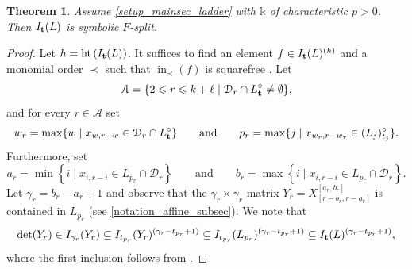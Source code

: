 \documentclass[12pt]{amsart}
\renewcommand{\leq}{\leqslant}
\newtheorem{theorem}{Theorem}[section]
\theoremstyle{definition}
\renewcommand{\(}{\left(}
\renewcommand{\)}{\right)}
\newcommand{\ZZ}{\mathbb{Z}}
\newcommand{\IN}{\operatorname{in}}
\newcommand{\Ht}{\operatorname{ht}}
\renewcommand{\!}[1]{{\color{red}\text{\Huge$\star$ }#1}}
\newcommand{\ttt}{{\bf t}}
\begin{document}
\begin{theorem}\label{ThmMixLadderSFP}
Assume \autoref{setup_mainsec_ladder} with   $\mathbb{k}$ of  characteristic $p>0$. %
Then $I_{\ttt}(L)$ is symbolic $F$-split.
\end{theorem}
\begin{proof}
Let $h = \Ht\left(I_{\ttt}(L)\right)$. It suffices to find an element $f \in I_{\ttt}(L)^{(h)}$ and a monomial order $\prec$ such that $\IN_\prec(f)$ is squarefree \cite[Lemma 6.2(1)]{DSMNB}. 
Let 
\begin{equation}\label{eq_inv1}
\mathcal{A} = \{2 \leq r \leq k+\ell \mid \mathcal{D}_r\cap L^\circ_\ttt\neq\emptyset\},
\end{equation}
and for every $r \in \mathcal{A}$  set 
\begin{equation}\label{eq_inv2}
w_r=\max\{w\mid x_{w,r-w}\in \mathcal{D}_r\cap L^\circ_\ttt\}
\qquad
\text{and}
\qquad
p_r = \max\{j \mid x_{w_r, r-w_r}\in  (L_j)^\circ_{t_j} \}.
\end{equation}
Furthermore,  set 
\begin{equation}\label{eq_inv3}
a_r=\min\left\{i\mid x_{i,r-i}\in L_{p_r}\cap \mathcal{D}_r\right\} \qquad \text{and}\qquad b_r=\max\left\{i\mid x_{i,r-i}\in L_{p_r}\cap \mathcal{D}_r\right\}.
\end{equation}
Let $\gamma_r= b_r-a_r+1$ and observe that the $\gamma_r \times \gamma_r$ matrix $Y_r=X^{[a_r,b_r]}_{[r-b_r,r-a_r]}$ is contained in $L_{p_r}$ (see \autoref{notation_affine_subsec}). 
  We note that %
\begin{equation}\label{eq_detY}
\det(Y_r) \in I_{\gamma_r}(Y_r) \subseteq I_{t_{p_r}}(Y_r)^{\left(\gamma_r-t_{p_r}+1\right)} \subseteq I_{t_{p_r}}(L_{p_r})^{\left(\gamma_r-t_{p_r}+1\right)} \subseteq I_{\ttt}(L) ^{\left(\gamma_r-t_{p_r}+1\right)},	
\end{equation}
where the first inclusion follows from \cite[Proposition 10.2]{BookDet}.



\end{proof}
\end{document}
